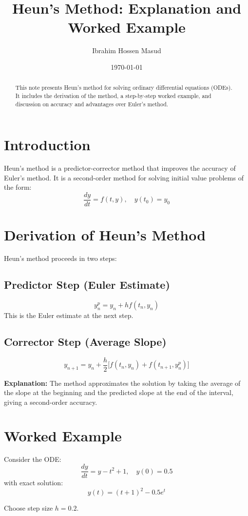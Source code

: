 \documentclass[11pt,a4paper]{article}
\title{Heun's Method: Explanation and Worked Example}
\author{Ibrahim Hossen Masud}
\date{\today}
\begin{document}
\maketitle

\begin{abstract}
This note presents Heun's method for solving ordinary differential equations (ODEs). 
It includes the derivation of the method, a step-by-step worked example, and discussion on accuracy and advantages over Euler's method.
\end{abstract}

\section{Introduction}
Heun's method is a predictor-corrector method that improves the accuracy of Euler's method. It is a second-order method for solving initial value problems of the form:
\[
\frac{dy}{dt} = f(t,y), \quad y(t_0) = y_0
\]

\section{Derivation of Heun's Method}
Heun's method proceeds in two steps:

\subsection{Predictor Step (Euler Estimate)}
\[
y_{n}^{p} = y_n + h f(t_n, y_n)
\]
This is the Euler estimate at the next step.

\subsection{Corrector Step (Average Slope)}
\[
y_{n+1} = y_n + \frac{h}{2} \Big[f(t_n, y_n) + f(t_{n+1}, y_n^{p}) \Big]
\]

\textbf{Explanation:} The method approximates the solution by taking the average of the slope at the beginning and the predicted slope at the end of the interval, giving a second-order accuracy.

\section{Worked Example}
Consider the ODE:
\[
\frac{dy}{dt} = y - t^2 + 1, \quad y(0) = 0.5
\]
with exact solution:
\[
y(t) = (t+1)^2 - 0.5 e^t
\]

Choose step size \(h = 0.2\).
\end{document}
